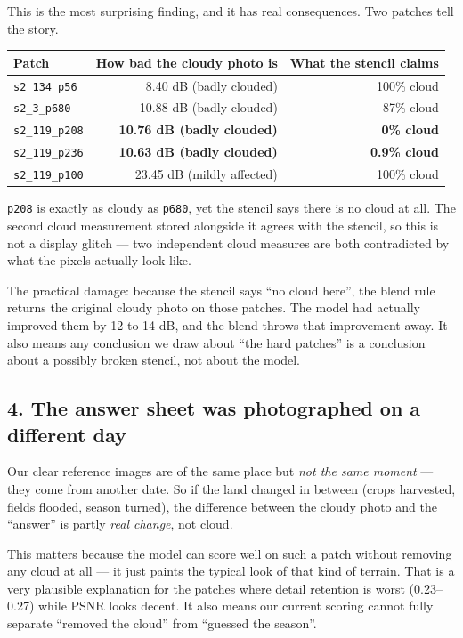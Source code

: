 \documentclass[11pt,a4paper]{article}
\newcommand{\code}[1]{\texttt{#1}}
\begin{document}
This is the most surprising finding, and it has real consequences. Two patches tell the story.

\begin{center}
\begin{tabular}{@{}lrr@{}}
\hline
Patch & How bad the cloudy photo is & What the stencil claims \\
\hline
\code{s2\_134\_p56} & 8.40 dB (badly clouded) & 100\% cloud \\
\code{s2\_3\_p680} & 10.88 dB (badly clouded) & 87\% cloud \\
\code{s2\_119\_p208} & \textbf{10.76 dB (badly clouded)} & \textbf{0\% cloud} \\
\code{s2\_119\_p236} & \textbf{10.63 dB (badly clouded)} & \textbf{0.9\% cloud} \\
\code{s2\_119\_p100} & 23.45 dB (mildly affected) & 100\% cloud \\
\hline
\end{tabular}
\end{center}

\code{p208} is exactly as cloudy as \code{p680}, yet the stencil says there is no cloud at all. The
second cloud measurement stored alongside it agrees with the stencil, so this is not a display
glitch --- two independent cloud measures are both contradicted by what the pixels actually look
like.

The practical damage: because the stencil says ``no cloud here'', the blend rule returns the
original cloudy photo on those patches. The model had actually improved them by 12 to 14 dB, and the
blend throws that improvement away. It also means any conclusion we draw about ``the hard patches''
is a conclusion about a possibly broken stencil, not about the model.

\subsection{4. The answer sheet was photographed on a different day}

Our clear reference images are of the same place but \emph{not the same moment} --- they come from
another date. So if the land changed in between (crops harvested, fields flooded, season turned),
the difference between the cloudy photo and the ``answer'' is partly \emph{real change}, not cloud.

This matters because the model can score well on such a patch without removing any cloud at all ---
it just paints the typical look of that kind of terrain. That is a very plausible explanation for
the patches where detail retention is worst (0.23--0.27) while PSNR looks decent. It also means our
current scoring cannot fully separate ``removed the cloud'' from ``guessed the season''.
\end{document}
